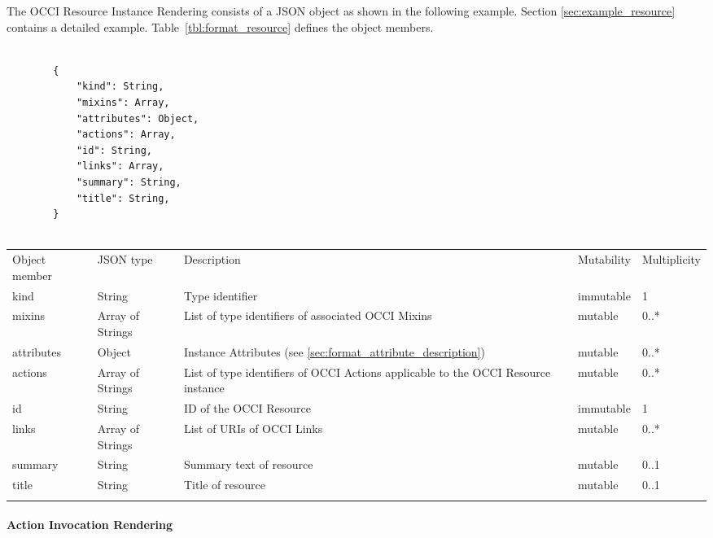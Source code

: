 \documentclass[10pt,a4paper]{article}
\begin{document}
The OCCI Resource Instance Rendering consists of a JSON object as shown in the
following example. Section \ref{sec:example_resource} contains a detailed
example.
Table~\ref{tbl:format_resource} defines the object members.
\begin{lstlisting}

        {
            "kind": String,
            "mixins": Array,
            "attributes": Object,
            "actions": Array,
            "id": String,
            "links": Array,
            "summary": String,
            "title": String,
        }


\end{lstlisting}
 {
    \begin{tabularx}{\textwidth}{llXll}
    \toprule
    Object member & JSON type & Description & Mutability & Multiplicity \\
    \colrule
    kind & String & Type identifier & immutable & 1 \\

    mixins & Array of Strings & List of type identifiers of associated OCCI
Mixins  &
mutable & 0..* \\

    attributes & Object & Instance Attributes (see
\ref{sec:format_attribute_description}) & mutable & 0..* \\

    actions & Array of Strings & List of type identifiers of OCCI
Actions applicable to the OCCI Resource instance & mutable & 0..* \\

    id & String & ID of the OCCI Resource & immutable & 1\\

    links & Array of Strings & List of URIs of OCCI Links & mutable & 0..*\\
    summary & String & Summary text of resource & mutable & 0..1 \\
    title & String & Title of resource & mutable & 0..1 \\
    \botrule
    \end{tabularx}
}

\paragraph{Action Invocation Rendering}
\label{sec:format_action_invocation}
\end{document}
